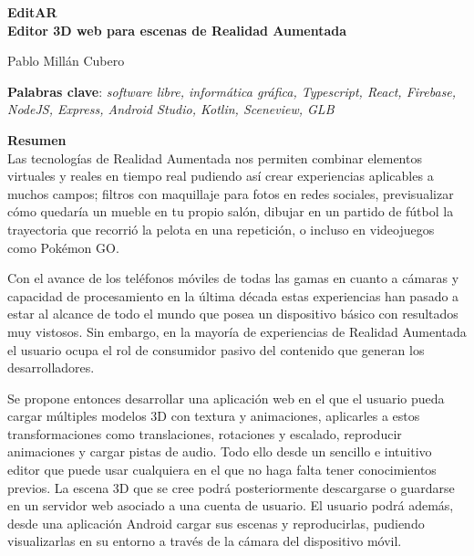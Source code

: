 \thispagestyle{empty}

\begin{center}
{\large\bfseries EditAR \\ Editor 3D web para escenas de Realidad Aumentada }\\
\end{center}
\begin{center}
Pablo Millán Cubero\\
\end{center}


\vspace{0.5cm}
\noindent\textbf{Palabras clave}: \textit{software libre, informática gráfica, Typescript, React, Firebase, NodeJS, Express, Android Studio, Kotlin, Sceneview, GLB}
\vspace{0.7cm}

\noindent\textbf{Resumen}\\
Las tecnologías de Realidad Aumentada nos permiten combinar elementos virtuales y reales en tiempo real pudiendo así crear experiencias aplicables a muchos campos; filtros con maquillaje para fotos en redes sociales, previsualizar cómo quedaría un mueble en tu propio salón, dibujar en un partido de fútbol la trayectoria que recorrió la pelota en una repetición, o incluso en videojuegos como Pokémon GO.

Con el avance de los teléfonos móviles de todas las gamas en cuanto a cámaras y capacidad de procesamiento en la última década estas experiencias han pasado a estar al alcance de todo el mundo que posea un dispositivo básico con resultados muy vistosos. Sin embargo, en la mayoría de experiencias de Realidad Aumentada el usuario ocupa el rol de consumidor pasivo del contenido que generan los desarrolladores.

Se propone entonces desarrollar una aplicación web en el que el usuario pueda cargar múltiples modelos 3D con textura y animaciones, aplicarles a estos transformaciones como translaciones, rotaciones y escalado, reproducir animaciones y cargar pistas de audio. Todo ello desde un sencillo e intuitivo editor que puede usar cualquiera en el que no haga falta tener conocimientos previos. La escena 3D que se cree podrá posteriormente descargarse o guardarse en un servidor web asociado a una cuenta de usuario. El usuario podrá además, desde una aplicación Android cargar sus escenas y reproducirlas, pudiendo visualizarlas en su entorno a través de la cámara del dispositivo móvil.



